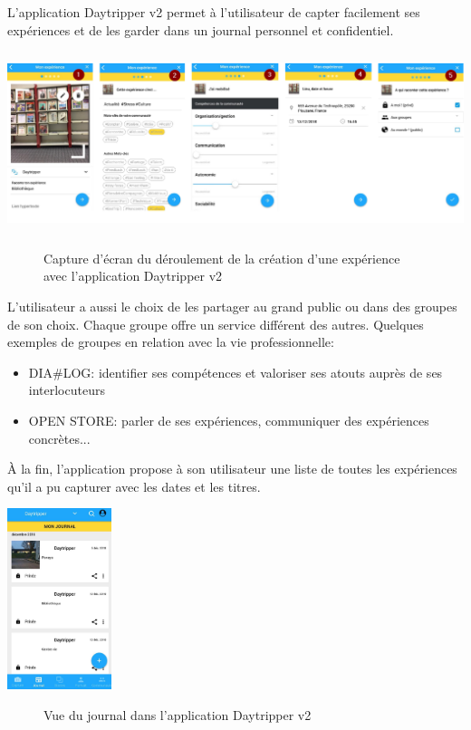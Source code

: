 \documentclass{report}
\begin{document}
L'application Daytripper v2 permet à l'utilisateur de capter facilement ses expériences et de les garder dans un journal personnel et confidentiel.
\begin{center}
\includegraphics[height=150pt]{daytrip.png}
\end{center}
\begin{figure}[H]
    \centering
    \caption{Capture d'écran du déroulement de la création d'une expérience avec l'application Daytripper v2}
    \label{fig:Daytripper}
\end{figure}
L'utilisateur a aussi le choix de les partager au grand public ou dans des groupes de son choix. Chaque groupe offre un service différent des autres.
Quelques exemples de groupes en relation avec la vie professionnelle:
\begin{itemize}
    \item DIA\#LOG: identifier ses compétences et valoriser ses atouts auprès de ses interlocuteurs
    \item OPEN STORE: parler de ses expériences, communiquer des expériences concrètes...
\end{itemize}
À la fin, l'application propose à son utilisateur une liste de toutes les expériences qu'il a pu capturer avec les dates et les titres.

\begin{center}
\includegraphics[height=150pt]{exp.jpg}
\end{center}
\begin{figure}[H]
    \centering
    \caption{Vue du journal dans l'application Daytripper v2}
    \label{fig:Daytripper}
\end{figure}
\end{document}
